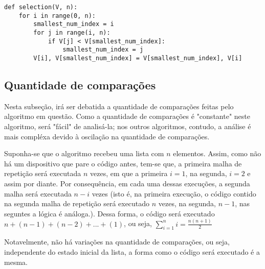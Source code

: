 \begin{lstlisting}
def selection(V, n):
    for i in range(0, n):
        smallest_num_index = i
        for j in range(i, n):
            if V[j] < V[smallest_num_index]:
                smallest_num_index = j
        V[i], V[smallest_num_index] = V[smallest_num_index], V[i]

\end{lstlisting}

\subsection*{Quantidade de comparações}
Nesta subseção, irá ser debatida a quantidade de comparações feitas pelo algoritmo em questão. Como a quantidade de comparações é "constante" neste algoritmo, será "fácil" de analisá-la; nos outros algoritmos, contudo, a análise é mais compléxa devido à oscilação na quantidade de comparações.

Suponha-se que o algoritmo recebeu uma lista com $n$ elementos. Assim, como não há um dispositivo que pare o código antes, tem-se que, a primeira malha de repetição será executada $n$ vezes, em que a primeira $i=1$, na segunda, $i=2$ e assim por diante. Por consequência, em cada uma dessas execuções, a segunda malha será executada $n-i$ vezes (isto é, na primeira execução, o código contido na segunda malha de repetição será executado $n$ vezes, na segunda, $n-1$, nas seguntes a lógica é análoga.). Dessa forma, o código será executado $n+(n-1)+(n-2)+...+(1)$, ou seja, $\sum_{i=1}^n i = \frac{n(n+1)}{2}$

Notavelmente, não há variações na quantidade de comparações, ou seja, independente do estado inicial da lista, a forma como o código será executado é a mesma.